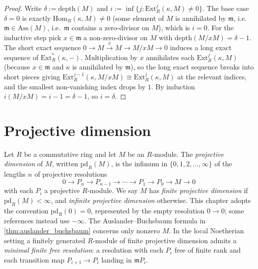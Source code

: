 \begin{proof}
  
  
  
  
  
\leanok
  Write \(\delta := \text{depth}(M)\) and \(i := \inf\{ j : \text{Ext}^j_R(\kappa, M) \neq 0 \}\).
  The base case \(\delta = 0\) is exactly \(\text{Hom}_R(\kappa, M) \neq 0\) (some element of
  \(M\) is annihilated by \(\mathfrak{m}\), i.e.\ \(\mathfrak{m} \in \text{Ass}(M)\), i.e.\
  \(\mathfrak{m}\) contains a zero-divisor on \(M\)), which is \(i = 0\). For the inductive step
  pick \(x \in \mathfrak{m}\) a non-zero-divisor on \(M\) with
  \(\text{depth}(M/xM) = \delta - 1\). The short exact sequence
  \(0 \to M \xrightarrow{x} M \to M/xM \to 0\) induces a long exact sequence of \(\text{Ext}^*_R(\kappa,
  -)\). Multiplication by \(x\) annihilates each \(\text{Ext}^j_R(\kappa, M)\) (because
  \(x \in \mathfrak{m}\) and \(\kappa\) is annihilated by \(\mathfrak{m}\)), so the long exact
  sequence breaks into short pieces giving
  \(\text{Ext}^{j-1}_R(\kappa, M/xM) \cong \text{Ext}^j_R(\kappa, M)\) at the relevant
  indices, and the smallest non-vanishing index drops by \(1\). By induction
  \(i(M/xM) = i - 1 = \delta - 1\), so \(i = \delta\).
\end{proof}

\section{Projective dimension}
\label{sec:ab_pd}

\begin{definition}[Projective dimension]\leanok
  \label{def:projective_dimension}
  Let \(R\) be a commutative ring and let \(M\) be an \(R\)-module. The \emph{projective
  dimension} of \(M\), written \(\text{pd}_R(M)\), is the infimum in
  \(\{0, 1, 2, \dots, \infty\}\) of the lengths \(n\) of projective resolutions
  \[
    0 \longrightarrow P_n \longrightarrow P_{n-1} \longrightarrow \cdots
    \longrightarrow P_1 \longrightarrow P_0 \longrightarrow M \longrightarrow 0
  \]
  with each \(P_i\) a projective \(R\)-module. We say \(M\) has \emph{finite projective dimension}
  if \(\text{pd}_R(M) < \infty\), and \emph{infinite projective dimension} otherwise.
  This chapter adopts the convention \(\text{pd}_R(0)=0\), represented by the empty
  resolution \(0 \to 0\); some references instead use \(-\infty\). The
  Auslander--Buchsbaum formula in \cref{thm:auslander_buchsbaum} concerns only nonzero \(M\).
  In the local Noetherian setting a finitely generated \(R\)-module of finite projective
  dimension admits a \emph{minimal finite free resolution}: a resolution with each \(P_i\)
  free of finite rank and each transition map \(P_{i+1} \to P_i\) landing in \(\mathfrak{m} P_i\).
\end{definition}

